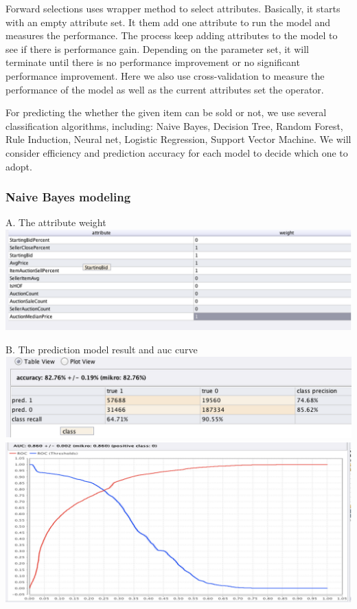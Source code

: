 \documentclass[CEJM,PDF]{cej} %
\begin{document}
Forward selections uses wrapper method to select attributes. Basically, it starts with an empty attribute set. It them add one attribute to run the model and measures the performance. The process keep adding attributes to the model to see if there is performance gain. Depending on the parameter set, it will terminate until there is no performance improvement or no significant performance improvement. Here we also use cross-validation to measure the performance of the model as well as the current attributes set the operator.

For predicting the whether the given item can be sold or not, we use several classification algorithms, including: Naive Bayes, Decision Tree, Random Forest, Rule Induction, Neural net, Logistic Regression, Support Vector Machine. We will consider efficiency and prediction accuracy for each model to decide which one to adopt.

\subsubsection{Naive Bayes modeling}
{\centering
    A. The attribute weight
    \vspace{3 mm}
    \includegraphics[scale=0.6]{rm-nb-aw.png}
    \par
}


{\centering
    B. The prediction model result and auc curve
    \vspace{3 mm}
    \includegraphics[scale=0.6]{rm-nb-perf.png}
    \vspace{3 mm}
    \includegraphics[scale=0.6]{rm-nb-auc.png}
    \par
}
\end{document}
